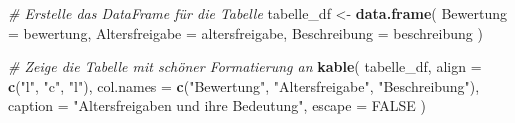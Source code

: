 \documentclass[
]{article}
\newenvironment{Shaded}{\begin{snugshade}}{\end{snugshade}}
\newcommand{\AttributeTok}[1]{\textcolor[rgb]{0.13,0.29,0.53}{#1}}
\newcommand{\CommentTok}[1]{\textcolor[rgb]{0.56,0.35,0.01}{\textit{#1}}}
\newcommand{\ConstantTok}[1]{\textcolor[rgb]{0.56,0.35,0.01}{#1}}
\newcommand{\FunctionTok}[1]{\textcolor[rgb]{0.13,0.29,0.53}{\textbf{#1}}}
\newcommand{\NormalTok}[1]{#1}
\newcommand{\OtherTok}[1]{\textcolor[rgb]{0.56,0.35,0.01}{#1}}
\newcommand{\StringTok}[1]{\textcolor[rgb]{0.31,0.60,0.02}{#1}}
\begin{document}
\begin{Shaded}
\begin{Highlighting}[]
\CommentTok{\# Erstelle das DataFrame für die Tabelle}
\NormalTok{tabelle\_df }\OtherTok{\textless{}{-}} \FunctionTok{data.frame}\NormalTok{(}
  \AttributeTok{Bewertung =}\NormalTok{ bewertung,}
  \AttributeTok{Altersfreigabe =}\NormalTok{ altersfreigabe,}
  \AttributeTok{Beschreibung =}\NormalTok{ beschreibung}
\NormalTok{)}

\CommentTok{\# Zeige die Tabelle mit schöner Formatierung an}
\FunctionTok{kable}\NormalTok{(}
\NormalTok{  tabelle\_df,}
  \AttributeTok{align =} \FunctionTok{c}\NormalTok{(}\StringTok{"l"}\NormalTok{, }\StringTok{"c"}\NormalTok{, }\StringTok{"l"}\NormalTok{),}
  \AttributeTok{col.names =} \FunctionTok{c}\NormalTok{(}\StringTok{"Bewertung"}\NormalTok{, }\StringTok{"Altersfreigabe"}\NormalTok{, }\StringTok{"Beschreibung"}\NormalTok{),}
  \AttributeTok{caption =} \StringTok{"Altersfreigaben und ihre Bedeutung"}\NormalTok{,}
  \AttributeTok{escape =} \ConstantTok{FALSE}
\NormalTok{)}
\end{Highlighting}
\end{Shaded}
\end{document}
